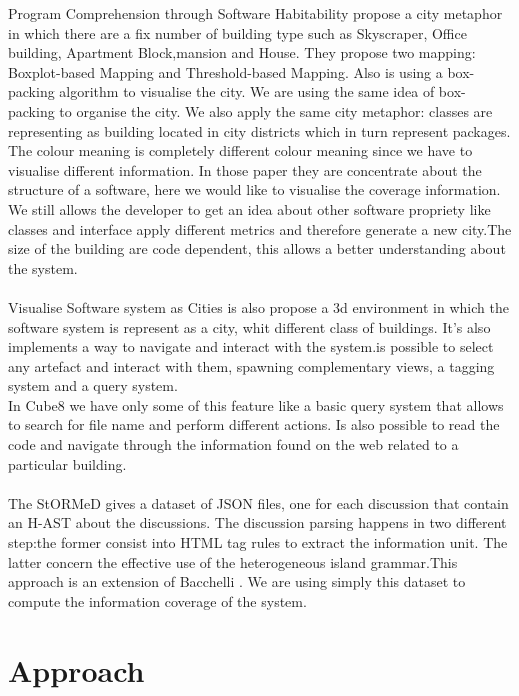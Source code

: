 \documentclass[]{usiinfbachelorproject}
\begin{document}
Program Comprehension through Software Habitability \cite{programComp} propose a city metaphor in which there are a fix number  of building type such as Skyscraper, Office building, Apartment Block,mansion and House. They propose two mapping: Boxplot-based Mapping and Threshold-based Mapping. Also is using a box-packing algorithm to visualise the city.  We are using the same idea of box-packing to organise the city. We also apply the same city metaphor: classes are representing as building located in city districts which in turn represent packages. \\The colour meaning is completely different colour meaning since we have to visualise different information. In those paper they are concentrate about the structure of a software, here we would like to visualise the coverage information. We still allows the developer to get an idea about other software propriety like classes and interface apply different metrics and therefore generate a new city.The size of the building are code dependent, this allows a better understanding about the system. \\ \\
Visualise Software system as Cities \cite{vssac} is also propose a 3d environment in which the software system is represent as a city, whit different class of buildings. It's also implements a way to navigate and interact with the system.is possible to select any artefact and interact with them, spawning complementary views,  a tagging system and a query system.\\
In Cube8 we have only some of this feature like a basic query system that allows to search for  file name and perform different actions. Is also possible to read the code and navigate through the information found on the web related to a particular building.\\ \\


The StORMeD \cite{stormy} gives a dataset of JSON files, one for each discussion that contain an H-AST about the discussions. The discussion parsing happens in two different step:the former consist into  HTML tag rules to extract the information unit. The latter concern the effective use of the  heterogeneous island grammar.This approach is an extension of Bacchelli \cite{Bacchelli}.  
 We are using simply this dataset to compute the information coverage of the system.

 




\newpage
\section{Approach} \label{approach}
\end{document}
